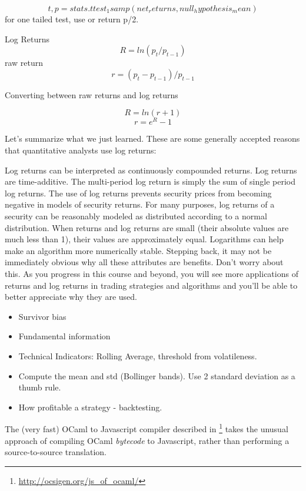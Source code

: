 \documentclass[a4paper]{tufte-handout}
\begin{document}
\[ t, p = stats.ttest_1samp(net_returns, null_hypothesis_mean) \]
for one tailed test, use or return  p/2.


Log Returns  \[ R = ln(p_t/p_{t -1} )\]
raw return  \[ r = (p_t - p_{t-1})/ p_{t-1} \]

Converting between raw returns and log returns

\[ R = ln(r+1) \]
\[ r = e^R - 1 \]

Let's summarize what we just learned. These are some generally accepted reasons that quantitative analysts use log returns:

Log returns can be interpreted as continuously compounded returns.
Log returns are time-additive. The multi-period log return is simply the sum of single period log returns.
The use of log returns prevents security prices from becoming negative in models of security returns.
For many purposes, log returns of a security can be reasonably modeled as distributed according to a normal distribution.
When returns and log returns are small (their absolute values are much less than 1), their values are approximately equal.
Logarithms can help make an algorithm more numerically stable.
Stepping back, it may not be immediately obvious why all these attributes are benefits. Don't worry about this. As you progress in this course and beyond, you will see more applications of returns and log returns in trading strategies and algorithms and you'll be able to better appreciate why they are used.




\begin{itemize}
    \item Survivor bias
    \item Fundamental information
    \item Technical Indicators: Rolling Average, threshold from volatileness.
    \item Compute the mean and std (Bollinger bands). Use 2 standard deviation as a thumb rule.
    \item How profitable a strategy - backtesting.
\end{itemize}

\hrulefill



The (very fast) OCaml to Javascript compiler described in \citep{VouillonBalat13}\footnote{\url{http://ocsigen.org/js_of_ocaml/}} takes the unusual approach of compiling OCaml \textit{bytecode} to Javascript, rather than performing a source-to-source translation.

\hrulefill








\end{document}
